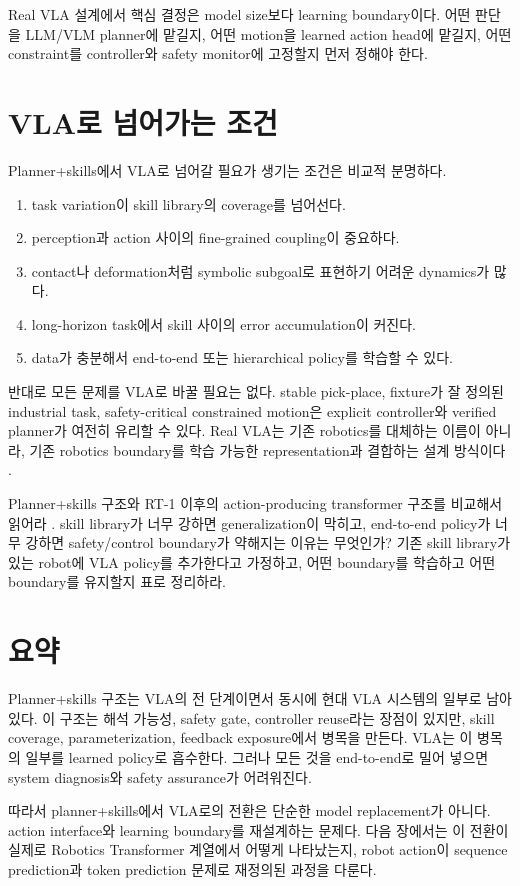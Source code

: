 \begin{tcolorbox}[title={Design principle: choose the learning boundary}]
Real VLA 설계에서 핵심 결정은 model size보다 learning boundary이다. 어떤 판단을 LLM/VLM planner에 맡길지, 어떤 motion을 learned action head에 맡길지, 어떤 constraint를 controller와 safety monitor에 고정할지 먼저 정해야 한다.
\end{tcolorbox}

\section{VLA로 넘어가는 조건}

Planner+skills에서 VLA로 넘어갈 필요가 생기는 조건은 비교적 분명하다.
\begin{enumerate}
  \item task variation이 skill library의 coverage를 넘어선다.
  \item perception과 action 사이의 fine-grained coupling이 중요하다.
  \item contact나 deformation처럼 symbolic subgoal로 표현하기 어려운 dynamics가 많다.
  \item long-horizon task에서 skill 사이의 error accumulation이 커진다.
  \item data가 충분해서 end-to-end 또는 hierarchical policy를 학습할 수 있다.
\end{enumerate}

반대로 모든 문제를 VLA로 바꿀 필요는 없다. stable pick-place, fixture가 잘 정의된 industrial task, safety-critical constrained motion은 explicit controller와 verified planner가 여전히 유리할 수 있다. Real VLA는 기존 robotics를 대체하는 이름이 아니라, 기존 robotics boundary를 학습 가능한 representation과 결합하는 설계 방식이다 \cite{saycan2022,codeaspolicies2022,rt12022}.

\chapterwork
{Planner+skills 구조와 RT-1 이후의 action-producing transformer 구조를 비교해서 읽어라 \cite{saycan2022,rt12022}.}
{skill library가 너무 강하면 generalization이 막히고, end-to-end policy가 너무 강하면 safety/control boundary가 약해지는 이유는 무엇인가?}
{기존 skill library가 있는 robot에 VLA policy를 추가한다고 가정하고, 어떤 boundary를 학습하고 어떤 boundary를 유지할지 표로 정리하라.}

\section{요약}

Planner+skills 구조는 VLA의 전 단계이면서 동시에 현대 VLA 시스템의 일부로 남아 있다. 이 구조는 해석 가능성, safety gate, controller reuse라는 장점이 있지만, skill coverage, parameterization, feedback exposure에서 병목을 만든다. VLA는 이 병목의 일부를 learned policy로 흡수한다. 그러나 모든 것을 end-to-end로 밀어 넣으면 system diagnosis와 safety assurance가 어려워진다.

따라서 planner+skills에서 VLA로의 전환은 단순한 model replacement가 아니다. action interface와 learning boundary를 재설계하는 문제다. 다음 장에서는 이 전환이 실제로 Robotics Transformer 계열에서 어떻게 나타났는지, robot action이 sequence prediction과 token prediction 문제로 재정의된 과정을 다룬다.
